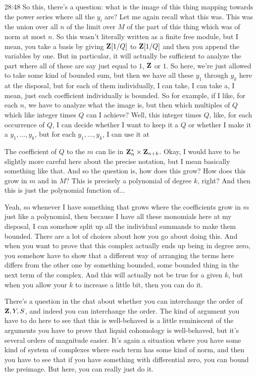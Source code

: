 \begin{unfinished}{28:48}
So this, there's a question: what is the image of this thing mapping towards the power series where all the $y_i$ are? Let me again recall what this was. This was the union over all $n$ of the limit over $M$ of the part of this thing which was of norm at most $n$. So this wasn't literally written as a finite free module, but I mean, you take a basis by giving $\mathbf Z[1/Q]$ to $\mathbf Z[1/Q]$ and then you append the variables by one. But in particular, it will actually be sufficient to analyze the part where all of these are say just equal to $1$, $\mathbf Z$ or $1$. So here, we're just allowed to take some kind of bounded sum, but then we have all these $y_1$ through $y_k$ here at the disposal, but for each of them individually, I can take, I can take a, I mean, just each coefficient individually is bounded. So for example, if I like, for each $n$, we have to analyze what the image is, but then which multiples of $Q$ which like integer times $Q$ can I achieve? Well, this integer times $Q$, like, for each occurrence of $Q$, I can decide whether I want to keep it a $Q$ or whether I make it a $y_1,...,y_k$, but for each $y_1,...,y_k$, I can use it at

The coefficient of $Q$ to the $m$ can lie in $\mathbf Z_n^* \times \mathbf Z_{n+k}$. Okay, I would have to be slightly more careful here about the precise notation, but I mean basically something like that. And so the question is, how does this grow? How does this grow in $m$ and in $M$? This is precisely a polynomial of degree $k$, right? And then this is just the polynomial function of...

Yeah, so whenever I have something that grows where the coefficients grow in $m$ just like a polynomial, then because I have all these monomials here at my disposal, I can somehow split up all the individual summands to make them bounded. There are a lot of choices about how you go about doing this. And when you want to prove that this complex actually ends up being in degree zero, you somehow have to show that a different way of arranging the terms here differs from the other one by something bounded, some bounded thing in the next term of the complex. And this will actually not be true for a given $k$, but when you allow your $k$ to increase a little bit, then you can do it.

There's a question in the chat about whether you can interchange the order of $\mathbf Z , Y ,S$, and indeed you can interchange the order. The kind of argument you have to do here to see that this is well-behaved is a little reminiscent of the arguments you have to prove that liquid cohomology is well-behaved, but it's several orders of magnitude easier. It's again a situation where you have some kind of system of complexes where each term has some kind of norm, and then you have to see that if you have something with differential zero, you can bound the preimage. But here, you can really just do it.
\end{unfinished}

